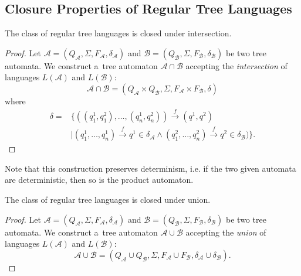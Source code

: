 

\subsection{Closure Properties of Regular Tree Languages}\label{ta-closures}

\begin{theorem}
 The class of regular tree languages is closed under intersection.
\end{theorem}

\begin{proof}
Let $\mathcal{A} = (Q_\mathcal{A}, \Sigma, F_\mathcal{A}, \delta_\mathcal{A})$
and $\mathcal{B} = (Q_\mathcal{B}, \Sigma, F_\mathcal{B}, \delta_\mathcal{B})$
be two tree automata. We construct a~tree automaton $\mathcal{A} \cap
\mathcal{B}$ accepting the \emph{intersection} of languages $L(\mathcal{A})$ and
$L(\mathcal{B})$:
\begin{equation}
\mathcal{A} \cap \mathcal{B}
= (Q_\mathcal{A} \times Q_\mathcal{B}, \Sigma, F_\mathcal{A} \times
F_\mathcal{B},\delta) \end{equation} where
 \begin{align}
 \delta = &\{
 ((q^1_1,q^2_1),\ldots,(q^1_n,q^2_n)) \overset{f}{\longrightarrow} (q^1,
 q^2)\nonumber \\
  & \mid (q^1_1,\ldots,q^1_n) \overset{f}{\longrightarrow} q^1 \in
  \delta_{\mathcal{A}} \wedge (q^2_1,\ldots,q^2_n) \overset{f}{\longrightarrow}
  q^2 \in \delta_{\mathcal{B}})\}.
	\end{align}
\end{proof}

Note that this construction preserves determinism, i.e. if the two given
automata are deterministic, then so is the product automaton.
\begin{theorem}
 The class of regular tree languages is closed under union.
\end{theorem}

\begin{proof}
Let $\mathcal{A} = (Q_\mathcal{A}, \Sigma, F_\mathcal{A}, \delta_\mathcal{A})$
and $\mathcal{B} = (Q_\mathcal{B}, \Sigma, F_\mathcal{B}, \delta_\mathcal{B})$
be two tree automata. We construct a~tree automaton $\mathcal{A} \cup
\mathcal{B}$ accepting the \emph{union} of languages $L(\mathcal{A})$ and
$L(\mathcal{B})$:
\begin{equation}
\mathcal{A} \cup
\mathcal{B} = (Q_\mathcal{A} \cup Q_\mathcal{B}, \Sigma, F_\mathcal{A} \cup
F_\mathcal{B}, \delta_\mathcal{A} \cup \delta_\mathcal{B}).
\end{equation}
\end{proof}

